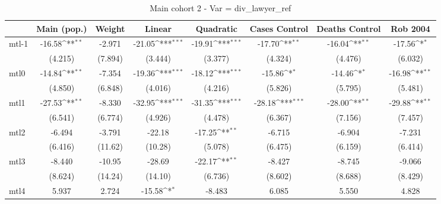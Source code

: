 \documentclass{article}
\begin{document}
{
\def\sym#1{\ifmmode^{#1}\else\(^{#1}\)\fi}
\begin{longtable}{l*{7}{c}}
\caption{Main cohort 2 - Var = div\_lawyer\_ref}\\
\hline\hline\endfirsthead\hline\endhead\hline\endfoot\endlastfoot
                &\multicolumn{1}{c}{Main (pop.)}&\multicolumn{1}{c}{Weight}&\multicolumn{1}{c}{Linear}&\multicolumn{1}{c}{Quadratic}&\multicolumn{1}{c}{Cases Control}&\multicolumn{1}{c}{Deaths Control}&\multicolumn{1}{c}{Rob 2004}\\
\hline
mtl-1           &   -16.58\sym{**} &   -2.971         &   -21.05\sym{***}&   -19.91\sym{***}&   -17.70\sym{**} &   -16.04\sym{**} &   -17.56\sym{*}  \\
                &  (4.215)         &  (7.894)         &  (3.444)         &  (3.377)         &  (4.324)         &  (4.476)         &  (6.032)         \\
mtl0            &   -14.84\sym{**} &   -7.354         &   -19.36\sym{***}&   -18.12\sym{***}&   -15.86\sym{*}  &   -14.46\sym{*}  &   -16.98\sym{**} \\
                &  (4.850)         &  (6.848)         &  (4.016)         &  (4.216)         &  (5.826)         &  (5.795)         &  (5.481)         \\
mtl1            &   -27.53\sym{**} &   -8.330         &   -32.95\sym{***}&   -31.35\sym{***}&   -28.18\sym{***}&   -28.00\sym{**} &   -29.88\sym{**} \\
                &  (6.541)         &  (6.774)         &  (4.926)         &  (4.478)         &  (6.367)         &  (7.156)         &  (7.457)         \\
mtl2            &   -6.494         &   -3.791         &   -22.18         &   -17.25\sym{**} &   -6.715         &   -6.904         &   -7.231         \\
                &  (6.416)         &  (11.62)         &  (10.28)         &  (5.078)         &  (6.475)         &  (6.159)         &  (6.414)         \\
mtl3            &   -8.440         &   -10.95         &   -28.69         &   -22.17\sym{**} &   -8.427         &   -8.745         &   -9.066         \\
                &  (8.624)         &  (14.24)         &  (14.10)         &  (6.736)         &  (8.602)         &  (8.688)         &  (8.429)         \\
mtl4            &    5.937         &    2.724         &   -15.58\sym{*}  &   -8.483         &    6.085         &    5.550         &    4.828         \\

\end{longtable}}
\end{document}
